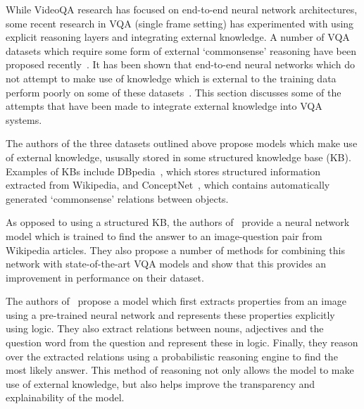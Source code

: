 \documentclass[../interim.tex]{subfiles}
\begin{document}
While VideoQA research has focused on end-to-end neural network architectures, some recent research in VQA (single frame setting) has experimented with using explicit reasoning layers and integrating external knowledge. A number of VQA datasets which require some form of external `commonsense' reasoning have been proposed recently~\cite{dataset:ok-vqa, dataset:fvqa, dataset:kb-vqa}. It has been shown that end-to-end neural networks which do not attempt to make use of knowledge which is external to the training data perform poorly on some of these datasets~\cite{dataset:ok-vqa}. This section discusses some of the attempts that have been made to integrate external knowledge into VQA systems.

The authors of the three datasets outlined above propose models which make use of external knowledge, ususally stored in some structured knowledge base (KB). Examples of KBs include DBpedia~\cite{kb:dbpedia}, which stores structured information extracted from Wikipedia, and ConceptNet~\cite{kb:conceptnet}, which contains automatically generated `commonsense' relations between objects.

As opposed to using a structured KB, the authors of~\cite{dataset:ok-vqa} provide a neural network model which is trained to find the answer to an image-question pair from Wikipedia articles. They also propose a number of methods for combining this network with state-of-the-art VQA models and show that this provides an improvement in performance on their dataset.

The authors of~\cite{explicit-reasoning-vqa} propose a model which first extracts properties from an image using a pre-trained neural network and represents these properties explicitly using logic. They also extract relations between nouns, adjectives and the question word from the question and represent these in logic. Finally, they reason over the extracted relations using a probabilistic reasoning engine to find the most likely answer. This method of reasoning not only allows the model to make use of external knowledge, but also helps improve the transparency and explainability of the model.
\end{document}
